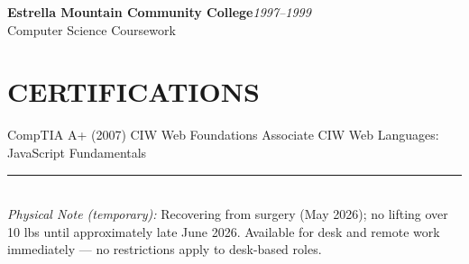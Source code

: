 \documentclass[9pt,letterpaper]{extarticle}
\begin{document}
\noindent\textbf{Estrella Mountain Community College}\hfill\textit{1997--1999}\\
Computer Science Coursework

\section*{CERTIFICATIONS}

CompTIA A+ (2007) \textbullet{} CIW Web Foundations Associate \textbullet{} CIW Web Languages: JavaScript Fundamentals

\vspace{8pt}
\noindent\rule{\linewidth}{0.4pt}
\vspace{3pt}
\\[2pt]
{\small\textit{Physical Note (temporary):} Recovering from surgery (May 2026); no lifting over 10 lbs until approximately late June 2026. Available for desk and remote work immediately --- no restrictions apply to desk-based roles.}
\end{document}
